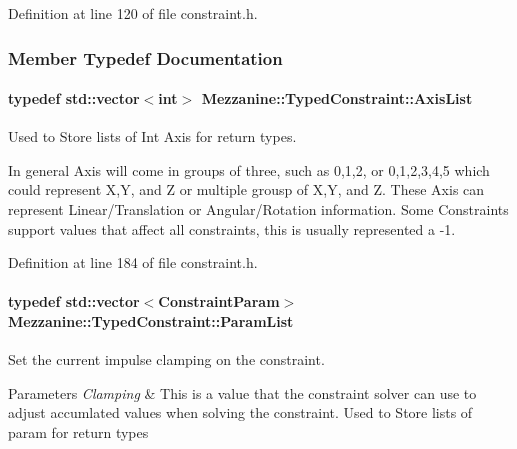 Definition at line 120 of file constraint.h.



\subsubsection{Member Typedef Documentation}
\hypertarget{classMezzanine_1_1TypedConstraint_ac6b8e0839cd686f73d0c9e9ad5db47a4}{
\paragraph[{AxisList}]{\setlength{\rightskip}{0pt plus 5cm}typedef std::vector$<$int$>$ {\bf Mezzanine::TypedConstraint::AxisList}}\hfill}
\label{classMezzanine_1_1TypedConstraint_ac6b8e0839cd686f73d0c9e9ad5db47a4}


Used to Store lists of Int Axis for return types. 

In general Axis will come in groups of three, such as 0,1,2, or 0,1,2,3,4,5 which could represent X,Y, and Z or multiple grousp of X,Y, and Z. These Axis can represent Linear/Translation or Angular/Rotation information. Some Constraints support values that affect all constraints, this is usually represented a -\/1. 

Definition at line 184 of file constraint.h.

\hypertarget{classMezzanine_1_1TypedConstraint_abd499db29c9e9755e9bb547d29eaa49a}{
\paragraph[{ParamList}]{\setlength{\rightskip}{0pt plus 5cm}typedef std::vector$<${\bf ConstraintParam}$>$ {\bf Mezzanine::TypedConstraint::ParamList}}\hfill}
\label{classMezzanine_1_1TypedConstraint_abd499db29c9e9755e9bb547d29eaa49a}


Set the current impulse clamping on the constraint. 


\begin{DoxyParams}{Parameters}
{\em Clamping} & This is a value that the constraint solver can use to adjust accumlated values when solving the constraint. Used to Store lists of param for return types \\
\hline
\end{DoxyParams}



